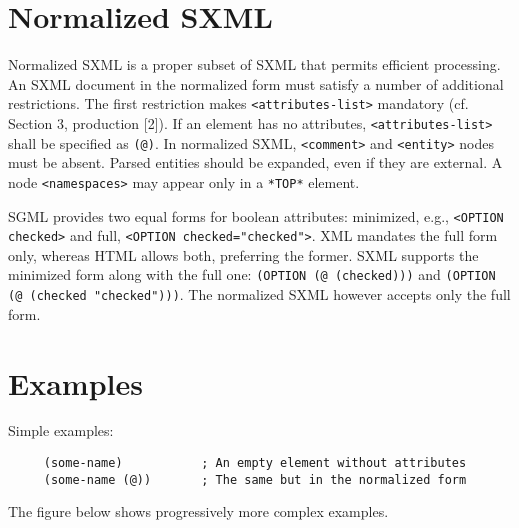\documentclass[10pt]{article}
\begin{document}
\section{Normalized SXML}
Normalized SXML is a proper subset of SXML that permits efficient
processing. An SXML document in the normalized form must satisfy a
number of additional restrictions. The first restriction makes
\texttt{<attributes-list>} mandatory (cf. Section 3,
production [2]). If an element has no attributes, \texttt{<attributes-list>} shall be specified as \texttt{(@)}. In normalized SXML,
\texttt{<comment>} and \texttt{<entity>} nodes
must be absent. Parsed entities should be expanded, even if they are external. 
A node \texttt{<namespaces>} may appear only in
a \texttt{*TOP*} element.

SGML provides two equal forms for boolean attributes: minimized, e.g., \texttt{<OPTION checked>} and full, \texttt{<OPTION checked="checked">}. XML mandates the full form only, whereas HTML allows both,
preferring the former. SXML supports the minimized form along with the
full one: \texttt{(OPTION (@ (checked)))} and \texttt{(OPTION (@ (checked "checked")))}. The normalized SXML however accepts only the full form.

\section{Examples}
Simple examples:\begin{verbatim}
     (some-name)           ; An empty element without attributes
     (some-name (@))       ; The same but in the normalized form
\end{verbatim}


The figure below shows progressively more complex examples.
\end{document}
